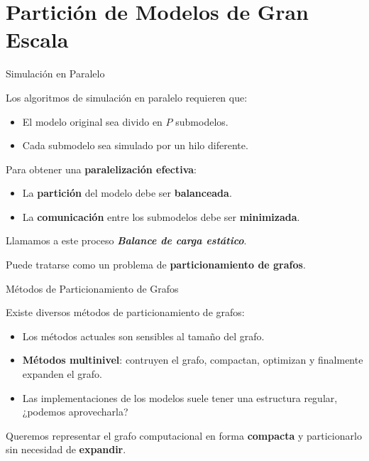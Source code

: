 \section{Partición de Modelos de Gran Escala}
\graphicspath{ {./content/} }


\begin{frame}{Simulación en Paralelo}

Los algoritmos de simulación en paralelo requieren que:

\begin{itemize}
    \item El modelo original sea divido en $P$ submodelos.

    \item Cada submodelo sea simulado por un hilo diferente.

\end{itemize}

Para obtener una \textbf{paralelización efectiva}:

\begin{itemize}
    \item La \textbf{partición} del modelo debe ser \textbf{balanceada}.

    \item La \textbf{comunicación} entre los submodelos debe ser \textbf{minimizada}.

\end{itemize}

Llamamos a este proceso \textbf{\textit{Balance de carga estático}}.

Puede tratarse como un problema de \textbf{particionamiento de grafos}.

\end{frame}



\begin{frame}{Métodos de Particionamiento de Grafos}

    Existe diversos métodos de particionamiento de grafos:

    \begin{itemize}
        \item Los métodos actuales son sensibles al tamaño del grafo.

        \item \textbf{Métodos multinivel}: contruyen el grafo, compactan,
        optimizan y finalmente expanden el grafo.

        \item Las implementaciones de los modelos suele tener una estructura regular,
        ¿podemos aprovecharla?
    \end{itemize}

    Queremos representar el grafo computacional en forma \textbf{compacta} y particionarlo
    sin necesidad de \textbf{expandir}.

\end{frame}




